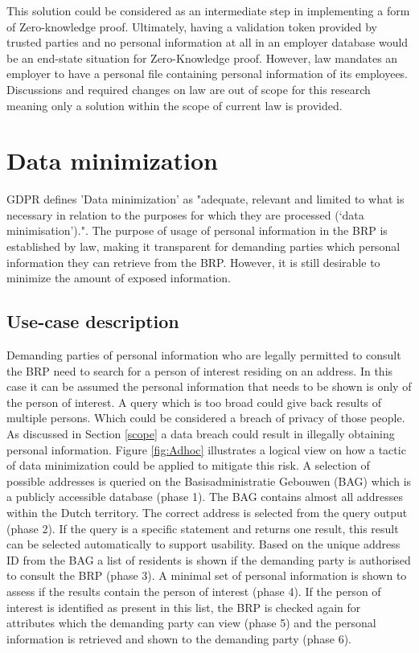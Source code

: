 This solution could be considered as an intermediate step in implementing a form of Zero-knowledge proof. Ultimately, having a validation token provided by trusted parties and no personal information at all in an employer database would be an end-state situation for Zero-Knowledge proof. However, law mandates an employer to have a personal file containing personal information of its employees. Discussions and required changes on law are out of scope for this research meaning only a solution within the scope of current law is provided.
\clearpage

\section{Data minimization} \label{data-minimization}

GDPR \cite{GDPR} defines 'Data minimization' as "adequate, relevant and limited to what is necessary in relation to the purposes for which they are processed (‘data minimisation’).". The purpose of usage of personal information in the BRP is established by law, making it transparent for demanding parties which personal information they can retrieve from the BRP. However, it is still desirable to minimize the amount of exposed information.

\subsection{Use-case description}
Demanding parties of personal information who are legally permitted to consult the BRP need to search for a person of interest residing on an address. In this case it can be assumed the personal information that needs to be shown is only of the person of interest. A query which is too broad could give back results of multiple persons. Which could be considered a breach of privacy of those people. As discussed in Section \ref{scope} a data breach could result in illegally obtaining personal information. Figure \ref{fig:Adhoc} illustrates a logical view on how a tactic of data minimization could be applied to mitigate this risk. A selection of possible addresses is queried on the Basisadministratie Gebouwen (BAG) \cite{BAG} which is a publicly accessible database (phase 1). The BAG contains almost all addresses within the Dutch territory. The correct address is selected from the query output (phase 2). If the query is a specific statement and returns one result, this result can be selected automatically to support usability. Based on the unique address ID from the BAG a list of residents is shown if the demanding party is authorised to consult the BRP (phase 3). A minimal set of personal information is shown to assess if the results contain the person of interest (phase 4). If the person of interest is identified as present in this list, the BRP is checked again for attributes which the demanding party can view (phase 5) and the personal information is retrieved and shown to the demanding party (phase 6).
    
